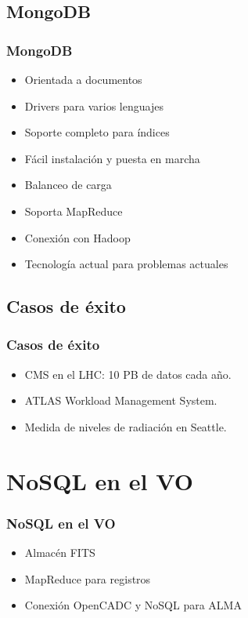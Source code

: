 \documentclass[serif,12pt]{beamer}
\begin{document}
\subsection{MongoDB}
\begin{frame}
\frametitle{MongoDB}

\begin{itemize}
\item Orientada a documentos
\item Drivers para varios lenguajes
\item Soporte completo para índices
\item Fácil instalación y puesta en marcha
\item Balanceo de carga
\item Soporta MapReduce
\item Conexión con Hadoop
\item Tecnología actual para problemas actuales
\end{itemize}

\end{frame}

\subsection{Casos de éxito}
\begin{frame}
\frametitle{Casos de éxito}

\begin{itemize}
\item CMS en el LHC: 10 PB de datos cada año.
\item ATLAS Workload Management System.
\item Medida de niveles de radiación en Seattle.
\end{itemize}


\end{frame}





\section{NoSQL en el VO}
\begin{frame}
\frametitle{NoSQL en el VO}

\begin{itemize}
\item Almacén FITS
\item MapReduce para registros
\item Conexión OpenCADC y NoSQL para ALMA
\end{itemize}


\end{frame}
\end{document}
